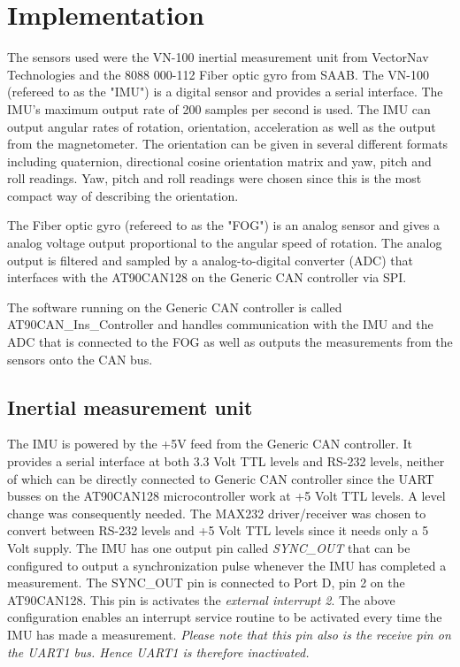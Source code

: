 
\section{Implementation}\label{sec:implementation}
The sensors used were the VN-100 inertial measurement unit from VectorNav Technologies and the 8088 000-112 Fiber optic gyro from SAAB. The VN-100 (refereed to as the "IMU") is a digital sensor and provides a serial interface. The IMU's  maximum output rate of 200 samples per second is used. The IMU can output angular rates of rotation, orientation, acceleration as well as the output from the magnetometer. The orientation can be given in several different formats including quaternion, directional cosine orientation matrix and yaw, pitch and roll readings. Yaw, pitch and roll readings were chosen since this is the most compact way of describing the orientation.

The Fiber optic gyro (refereed to as the "FOG") is an analog sensor and gives a analog voltage output proportional to the angular speed of rotation. The analog output is filtered and sampled by a analog-to-digital converter (ADC) that interfaces with the AT90CAN128 on the Generic CAN controller via SPI.

The software running on the Generic CAN controller is called AT90CAN\_Ins\_Controller and handles communication with the IMU and the ADC that is connected to the FOG as well as outputs the measurements from the sensors onto the CAN bus.

\subsection{Inertial measurement unit}
The IMU is powered by the +5V feed from the Generic CAN controller. It provides a serial interface at both 3.3 Volt TTL levels and RS-232 levels, neither of which can be directly connected to Generic CAN controller since the UART busses on the AT90CAN128 microcontroller work at +5 Volt TTL levels. A level change was consequently needed. The MAX232 driver/receiver was chosen to convert between RS-232 levels and +5 Volt TTL levels since it needs only a 5 Volt supply. \newline
The IMU has one output pin called \emph{SYNC\_OUT} that can be configured to output a synchronization pulse whenever the IMU has completed a measurement. The SYNC\_OUT pin is connected to Port D, pin 2 on the AT90CAN128. This pin is activates the \emph{external interrupt 2}. \newline
The above configuration enables an interrupt service routine to be activated every time the IMU has made a measurement.\newline 
\emph{Please note that this pin also is the receive pin on the UART1 bus. Hence UART1 is therefore inactivated.} 

